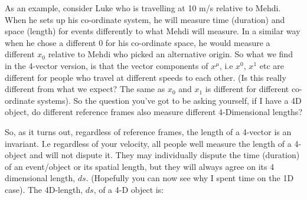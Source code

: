 As an example, consider Luke who is travelling at 10 m/s relative to Mehdi. When he sets up his co-ordinate system, he will measure time (duration) and space (length) for events differently to what Mehdi will measure. In a similar way when he chose a different 0 for his co-ordinate space, he would measure a different $x_0$ relative to Mehdi who picked an alternative origin. So what we find in the 4-vector version, is that the vector components of $x^\mu$, i.e $x^0$, $x^1$ etc are different for people who travel at different speeds to each other. (Is this really different from what we expect? The same as $x_0$ and $x_1$ is different for different co-ordinate systems). So the question you've got to be asking yourself, if I have a 4D object, do different reference frames also measure different 4-Dimensional lengths?


So, as it turns out, regardless of reference frames, the length of a 4-vector is an invariant. I.e regardless of your velocity, all people well measure the length of a 4-object and will not dispute it. They may individually dispute the time (duration) of an event/object or its spatial length, but they will always agree on its 4 dimensional length, $ds$. (Hopefully you can now see why I spent time on the 1D case). The 4D-length, $ds$,  of a 4-D object is:


